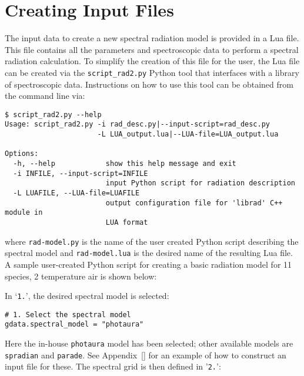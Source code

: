 \chapter{Creating Input Files}
\label{chap:input}

The input data to create a new spectral radiation model is provided in a Lua file.
This file contains all the parameters and spectroscopic data to perform a spectral radiation calculation.
To simplify the creation of this file for the user, the Lua file can be created via the \texttt{script\_rad2.py} Python tool that interfaces with a library of spectroscopic data.
Instructions on how to use this tool can be obtained from the command line via:

\begin{lstlisting}[basicstyle=\ttfamily\small]
$ script_rad2.py --help
Usage: script_rad2.py -i rad_desc.py|--input-script=rad_desc.py
                      -L LUA_output.lua|--LUA-file=LUA_output.lua

Options:
  -h, --help            show this help message and exit
  -i INFILE, --input-script=INFILE
                        input Python script for radiation description
  -L LUAFILE, --LUA-file=LUAFILE
                        output configuration file for 'librad' C++ module in
                        LUA format
\end{lstlisting}

\noindent where \texttt{rad-model.py} is the name of the user created Python script describing the spectral model and \texttt{rad-model.lua} is the desired name of the resulting Lua file.
A sample user-created Python script for creating a basic radiation model for 11 species, 2 temperature air is shown below:

\noindent \topbar

\bottombar

In `\texttt{1.}', the desired spectral model is selected:

\begin{lstlisting}[basicstyle=\ttfamily\small]
# 1. Select the spectral model
gdata.spectral_model = "photaura"
\end{lstlisting}

Here the in-house \texttt{photaura} model has been selected; other available models are \texttt{spradian} and \texttt{parade}.
See Appendix~\ref{} for an example of how to construct an input file for these.
The spectral grid is then defined in '\texttt{2.}':

